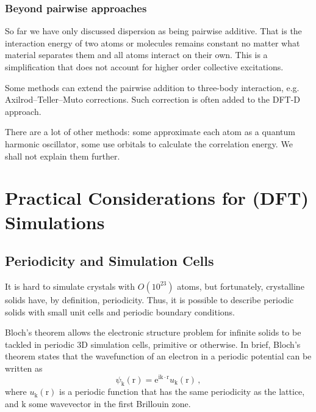 \documentclass{article}
\theoremstyle{plain}\theoremheaderfont{\normalfont\itshape}\theorembodyfont{\rmfamily}\theoremseparator{.}\newtheorem*{rem}{Remark}\newtheorem*{ex}{Example}\newtheorem*{proof}{Proof}\newtheorem*{altp}{Alternative proof}
\theoremstyle{plain}\theoremheaderfont{\normalfont\bfseries}\theorembodyfont{\rmfamily}\theoremseparator{.}\newtheorem{thm}{Theorem}[section]\newtheorem{lem}[thm]{Lemma}\newtheorem{prop}[thm]{Proposition}\newtheorem*{cor}{Corollary}\newtheorem{defn}[thm]{Definition}\newtheorem{clm}[thm]{Claim}\newtheorem{clminproof}{Claim}\newtheorem{pos}{Postulate}[section]
\theoremstyle{break}\theoremheaderfont{\normalfont\itshape}\theorembodyfont{\rmfamily}\theoremseparator{.\medskip}\newtheorem*{proofskip}{Proof}\newtheorem*{exs}{Examples}\newtheorem*{rems}{Remarks}
\theoremstyle{break}\theoremheaderfont{\normalfont\bfseries}\theorembodyfont{\rmfamily}\theoremseparator{.\medskip}\newtheorem{lemskip}[thm]{Lemma}\newtheorem{defnskip}[thm]{Definition}\newtheorem{propskip}[thm]{Proposition}\newtheorem{thmskip}[thm]{Theorem}
\numberwithin{equation}{section}
\newcommand{\ii}{\mathrm{i}}
\newcommand{\ee}{\mathrm{e}}
\newcommand{\vb}[1]{\bm{\mathrm{#1}}}
\newcommand{\vdot}{\,\bm{\mathrm{\cdot}}\,}
\begin{document}
    \subsubsection{Beyond pairwise approaches}
    So far we have only discussed dispersion as being pairwise additive. That is the interaction energy of two atoms or molecules remains constant no matter what material separates them and all atoms interact on their own. This is a simplification that does not account for higher order collective excitations.

    Some methods can extend the pairwise addition to three-body interaction, e.g. Axilrod--Teller--Muto corrections. Such correction is often added to the DFT-D approach.

    There are a lot of other methods: some approximate each atom as a quantum harmonic oscillator, some use orbitals to calculate the correlation energy. We shall not explain them further.

    \section{Practical Considerations for (DFT) Simulations}
    \subsection{Periodicity and Simulation Cells}
    It is hard to simulate crystals with \(O(10^{23})\) atoms, but fortunately, crystalline solids have, by definition, periodicity. Thus, it is possible to describe periodic solids with small unit cells and periodic boundary conditions.

    Bloch's theorem allows the electronic structure problem for infinite solids to be tackled in periodic 3D simulation cells, primitive or otherwise. In brief, Bloch's theorem states that the wavefunction of an electron in a periodic potential can be written as
    \begin{equation}
        \psi_{\vb{k}}(\vb{r})=\ee^{\ii\vb{k}\vdot\vb{r}}u_{\vb{k}}(\vb{r})\,,
    \end{equation}
    where \(u_{\vb{k}}(\vb{r})\) is a periodic function that has the same periodicity as the lattice, and \(\vb{k}\) some wavevector in the first Brillouin zone.
\end{document}
